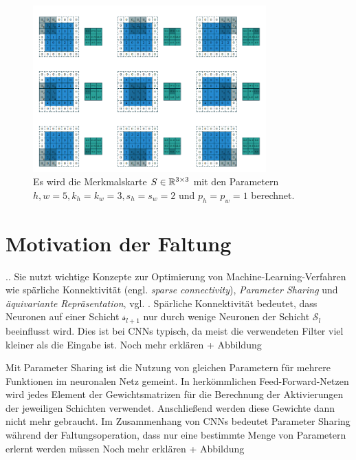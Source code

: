 \begin{figure}[h]
    \includegraphics[width=0.8\textwidth]{pics/abb_simplecov_padding}
    \centering
    \caption{Es wird die Merkmalskarte $S \in \mathbb{R}^{3 \times 3}$ mit den Parametern ${h,w=5}, k_h=k_w=3, s_h=s_w=2$ und $p_h=p_w=1$ berechnet.}
    \label{abb_simplematrixconv_padding}
\end{figure}



\section{Motivation der Faltung}
..
Sie nutzt wichtige Konzepte zur Optimierung von Machine-Learning-Verfahren wie spärliche Konnektivität (engl. \textit{sparse connectivity}), \textit{Parameter Sharing} und \textit{äquivariante Repräsentation}, vgl. \cite{goodfellow}. Spärliche Konnektivität bedeutet, dass Neuronen auf einer Schicht $\mathcal{s}_{l+1}$ nur durch wenige Neuronen der Schicht $\mathcal{S}_l$ beeinflusst wird. Dies ist bei CNNs typisch, da meist die verwendeten Filter viel kleiner als die Eingabe ist. Noch mehr erklären + Abbildung

Mit Parameter Sharing ist die Nutzung von gleichen Parametern für mehrere Funktionen im neuronalen Netz gemeint. In herkömmlichen Feed-Forward-Netzen wird jedes Element der Gewichtsmatrizen für die Berechnung der Aktivierungen der jeweiligen Schichten verwendet. Anschließend werden diese Gewichte dann nicht mehr gebraucht. Im Zusammenhang von CNNs bedeutet Parameter Sharing während der Faltungsoperation, dass nur eine bestimmte Menge von Parametern erlernt werden müssen
Noch mehr erklären + Abbildung

